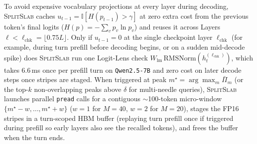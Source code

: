 \documentclass[pdflatex,sn-mathphys-num]{sn-jnl}
\theoremstyle{thmstyleone}
\newcommand{\SplitSlab}{\textsc{SplitSlab}}
\begin{document}
To avoid expensive vocabulary projections at every layer during decoding, \SplitSlab{} caches $u_{t-1} = \mathbb{I}[H(p_{t-1}) > \gamma]$ at zero extra cost from the previous token's final logits ($H(p) = -\sum_v p_v \ln p_v$) and reuses it across Layers $\ell < \ell_{\mathrm{chk}} = \lfloor 0.75 L \rfloor$. Only if $u_{t-1} = 0$ at the single checkpoint layer $\ell_{\mathrm{chk}}$ (for example, during turn prefill before decoding begins, or on a sudden mid-decode spike) does \SplitSlab{} run one Logit-Lens check $W_{\mathrm{lm}}\,\mathrm{RMSNorm}(h_t^{(\ell_{\mathrm{chk}})})$, which takes 6.6\,ms once per prefill turn on \texttt{Qwen2.5-7B} and zero cost on later decode steps once stripes are staged. When triggered at peak $m^\star = \arg\max_m \bar{\Pi}_m$ (or the top-$k$ non-overlapping peaks above $\delta$ for multi-needle queries), \SplitSlab{} launches parallel \texttt{pread} calls for a contiguous $\sim$100-token micro-window $\{m^\star - w, \dots, m^\star + w\}$ ($w = 1$ for $M = 40$, $w = 2$ for $M = 20$), stages the FP16 stripes in a turn-scoped HBM buffer (replaying turn prefill once if triggered during prefill so early layers also see the recalled tokens), and frees the buffer when the turn ends.
\end{document}
